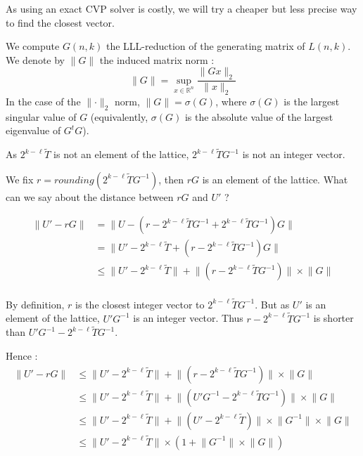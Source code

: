 \documentclass[submission,svgnames,journal=tosc]{iacrtrans}
\begin{document}
As using an exact CVP solver is costly, we will try a cheaper but less precise way to find the closest vector.

We compute \(G(n,k)\) the LLL-reduction of the generating matrix of \(L(n,k)\). We denote by  \(\rVert G \lVert\) the induced matrix norm :
\[\rVert G \lVert =  \sup_{x \in \mathbb{R}^n}\frac{\lVert Gx \rVert_2}{\lVert x \rVert_2}\]
In the case of the \(\lVert \cdot \rVert_2\) norm,
\(\rVert G \lVert = \sigma(G)\), where \(\sigma(G)\) is the largest singular
value of $G$ (equivalently, $\sigma(G)$ is the absolute value of the largest
eigenvalue of $G^{t} G$).


As \(2^{k-\ell}\widetilde{T}\) is not an element of the lattice, \(2^{k-\ell}\widetilde{T}G^{-1}\) is not an integer vector.

We fix \(r = rounding(2^{k-\ell}\widetilde{T}G^{-1}) \), then \(rG\) is an element of the lattice. What can we say about the distance between \(rG\) and \(U'\) ?

\begin{align*}
\lVert U' - rG \rVert &= \lVert U - (r-2^{k-\ell}\widetilde{T}G^{-1} + 2^{k-\ell}\widetilde{T}G^{-1})G \rVert\\
&= \lVert U' - 2^{k-\ell}\widetilde{T} + (r-2^{k-\ell}\widetilde{T}G^{-1})G \rVert\\
&\leqslant \lVert U' - 2^{k-\ell}\widetilde{T} \rVert + \lVert(r-2^{k-\ell}\widetilde{T}G^{-1})\rVert \times \lVert G\rVert\\	
\end{align*}

By definition, \(r\) is the closest integer vector to \(2^{k-\ell}\widetilde{T}G^{-1}\). But as \(U'\) is an element of the lattice, \(U'G^{-1}\) is an integer vector. Thus \(r-2^{k-\ell}\widetilde{T}G^{-1}\) is shorter than \(U'G^{-1}-2^{k-\ell}\widetilde{T}G^{-1}\).

Hence :
\begin{align*}
\lVert U' - rG \rVert &\leqslant \lVert U' - 2^{k-\ell}\widetilde{T} \rVert + \lVert(r-2^{k-\ell}\widetilde{T}G^{-1})\rVert \times \lVert G\rVert\\	
&\leqslant \lVert U' - 2^{k-\ell}\widetilde{T} \rVert + \lVert(U'G^{-1}-2^{k-\ell}\widetilde{T}G^{-1})\rVert \times \lVert G\rVert\\	
&\leqslant \lVert U' - 2^{k-\ell}\widetilde{T} \rVert + \lVert(U'-2^{k-\ell}\widetilde{T})\rVert \times \lVert G^{-1} \rVert  \times \lVert G\rVert\\
& 	\leqslant \lVert U' - 2^{k-\ell}\widetilde{T} \rVert \times (1 +\lVert G^{-1} \rVert  \times \lVert G\rVert )\\
\end{align*}
\end{document}
